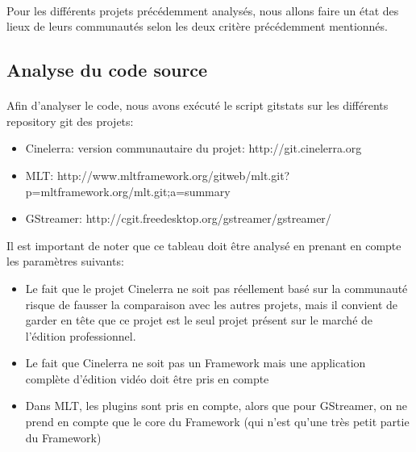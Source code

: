 \paragraph{}

Pour les différents projets précédemment analysés, nous allons
faire un état des lieux de leurs communautés selon les deux critère
précédemment mentionnés.

\subsection {Analyse du code source}

\paragraph{}

Afin d'analyser le code, nous avons exécuté le script gitstats sur
les différents repository git des projets:

\begin{itemize}

  \item {Cinelerra: version communautaire du projet:
  http://git.cinelerra.org }

  \item {MLT:
http://www.mltframework.org/gitweb/mlt.git?p=mltframework.org/mlt.git;a=summary}

  \item {GStreamer: http://cgit.freedesktop.org/gstreamer/gstreamer/ }

\end{itemize}

Il est important de noter que ce tableau doit être analysé en prenant
en compte les paramètres suivants:

\begin{itemize}

  \item {Le fait que le projet Cinelerra ne soit pas réellement basé
  sur la communauté
    risque de fausser la comparaison avec les autres projets, mais il
    convient de garder en tête que ce projet est le seul projet présent
    sur le marché de l'édition professionnel.}


  \item {Le fait que Cinelerra ne soit pas un Framework mais une
    application complète d'édition vidéo doit être pris en compte}

  \item {Dans MLT, les plugins sont pris en compte, alors
  que pour GStreamer, on ne prend en compte que le core du Framework
  (qui n'est qu'une très petit partie du Framework)}

\end{itemize}

